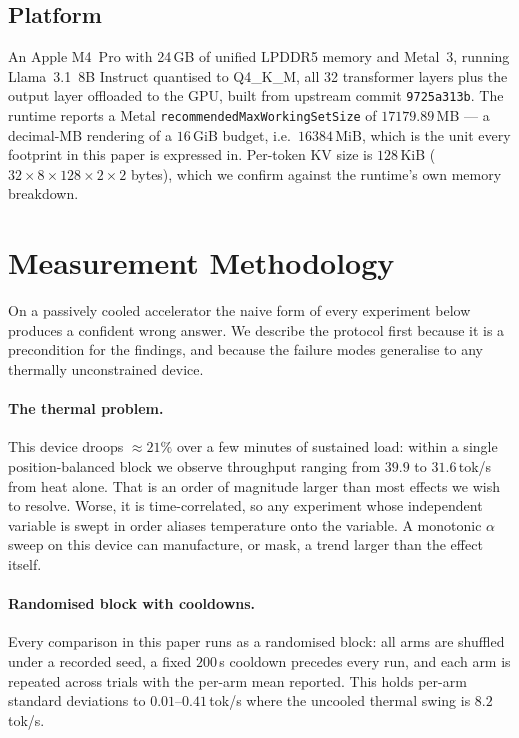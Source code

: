 \documentclass[manuscript,anonymous,review]{acmart}
\begin{document}
\subsection{Platform}

An Apple M4~Pro with 24\,GB of unified LPDDR5 memory and Metal~3,
running Llama~3.1~8B Instruct quantised to Q4\_K\_M, all 32
transformer layers plus the output layer offloaded to the GPU, built
from upstream commit \texttt{9725a313b}. The runtime reports a Metal
\texttt{recommendedMaxWorkingSetSize} of $17179.89$\,MB --- a decimal-MB
rendering of a $16$\,GiB budget, i.e.\ $16384$\,MiB, which is the unit
every footprint in this paper is expressed in. Per-token KV
size is $128$\,KiB ($32 \times 8 \times 128 \times 2 \times 2$ bytes),
which we confirm against the runtime's own memory breakdown.

\section{Measurement Methodology}
\label{sec:method}

On a passively cooled accelerator the naive form of every experiment
below produces a confident wrong answer. We describe the protocol
first because it is a precondition for the findings, and because the
failure modes generalise to any thermally unconstrained device.

\paragraph{The thermal problem.} This device droops ${\approx}21\%$
over a few minutes of sustained load: within a single position-balanced
block we observe throughput ranging from $39.9$ to $31.6$\,tok/s from
heat alone. That is an order of magnitude larger than most effects we
wish to resolve. Worse, it is time-correlated, so any experiment whose
independent variable is swept in order aliases temperature onto the
variable. A monotonic $\alpha$ sweep on this device can manufacture, or
mask, a trend larger than the effect itself.

\paragraph{Randomised block with cooldowns.} Every comparison in this
paper runs as a randomised block: all arms are shuffled under a
recorded seed, a fixed $200$\,s cooldown precedes every run, and each
arm is repeated across trials with the per-arm mean reported. This
holds per-arm standard deviations to $0.01$--$0.41$\,tok/s where the
uncooled thermal swing is $8.2$\,tok/s.
\end{document}
